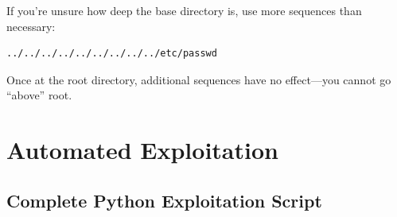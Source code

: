 \documentclass[11pt,letterpaper]{article}
\newcommand{\code}[1]{\texttt{\detokenize{#1}}}
\begin{document}
\begin{notebox}
If you're unsure how deep the base directory is, use more \code{../} sequences than necessary:
\begin{verbatim}
../../../../../../../../../etc/passwd
\end{verbatim}
Once at the root directory, additional \code{../} sequences have no effect---you cannot go ``above'' root.
\end{notebox}

\section{Automated Exploitation}

\subsection{Complete Python Exploitation Script}
\end{document}

